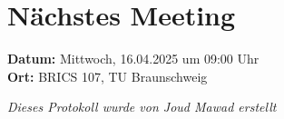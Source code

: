 \documentclass[11pt,a4paper]{article}
\begin{document}
\section*{Nächstes Meeting}
\textbf{Datum:} Mittwoch, 16.04.2025 um 09:00 Uhr \\
\textbf{Ort:} BRICS 107, TU Braunschweig

\vspace{1em}
\begin{center}
    \textit{Dieses Protokoll wurde von Joud Mawad erstellt}
\end{center}
\end{document}
